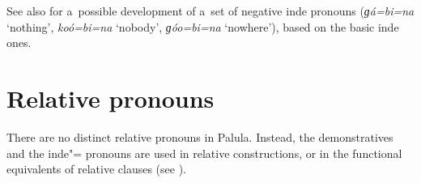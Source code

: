 See also  for a~possible development of a~set of negative inde pronouns (\textit{ɡá=bi=na} `nothing', \textit{koó=bi=na} `nobody', \textit{ɡóo=bi=na} `nowhere'), based on the basic inde ones.

\section{Relative pronouns}
\label{sec:5-8}

\largerpage

There are no distinct relative pronouns in Palula. Instead, the demonstratives and the inde"= pronouns are used in relative constructions, or in the functional equivalents of relative clauses (see ).